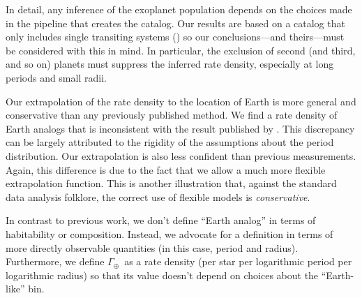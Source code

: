 \documentclass[12pt,preprint]{aastex}
\newcommand{\rate}{\ensuremath{\Gamma}}
\newcommand{\gammaearth}{{\ensuremath{\rate_\oplus}}}
\begin{document}
In detail, any inference of the exoplanet population depends on the choices
made in the pipeline that creates the catalog.
Our results are based on a catalog that only includes single transiting
systems (\citealt{petigura}) so our conclusions---and theirs---must be
considered with this in mind.
In particular, the exclusion of second (and third, and so on) planets must
suppress the inferred rate density, especially at long periods and small
radii.

Our extrapolation of the rate density to the location of Earth is more general
and conservative than any previously published method.
We find a rate density of Earth analogs that is inconsistent with the result
published by \citet{petigura}.
This discrepancy can be largely attributed to the rigidity of the assumptions
about the period distribution.
Our extrapolation is also less confident than previous measurements.
Again, this difference is due to the fact that we allow a much more flexible
extrapolation function.
This is another illustration that, against the standard data analysis
folklore, the correct use of flexible models is \emph{conservative}.

In contrast to previous work, we don't define ``Earth analog'' in terms of
habitability or composition.
Instead, we advocate for a definition in terms of more directly observable
quantities (in this case, period and radius).
Furthermore, we define \gammaearth\ as a rate density (per star per
logarithmic period per logarithmic radius) so that its value doesn't depend on
choices about the ``Earth-like'' bin.
\end{document}
